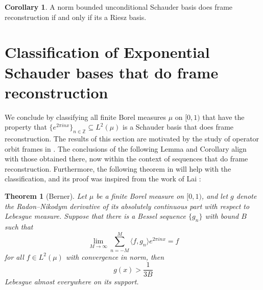 \documentclass[11pt]{amsart}
\newtheorem*{thm*}{Theorem}
\theoremstyle{definition}
\newtheorem{cor}{Corollary}[section]
\numberwithin{equation}{section}
\begin{document}
\begin{cor}
A norm bounded unconditional Schauder basis does frame reconstruction if and only if its a Riesz basis.
\end{cor}


\section{Classification of Exponential Schauder bases that do frame reconstruction}\label{s8}
We conclude by classifying all finite Borel measures $\mu$ on $[0,1)$ that have the property that $\{ e^{2 \pi i n x} \}_{n \in \mathbb{Z}} \subseteq L^2(\mu)$ is a Schauder basis that does frame reconstruction. The results of this section are motivated by the study of operator orbit frames in \cite{Berner2024Operator}. The conclusions of the following Lemma and Corollary align with those obtained there, now within the context of sequences that do frame reconstruction. Furthermore, the following theorem in \cite{Berner2024Frame-like} will help with the classification, and its proof was inspired from the work of Lai \cite{Lai2011Fourier}:
\begin{thm*}[Berner]
Let $\mu$ be a finite Borel measure on $[0,1)$, and let $g$ denote the Radon–Nikodym derivative of its absolutely continuous part with respect to Lebesgue measure. Suppose that there is a Bessel sequence $\{g_{n}\}$ with bound $B$ such that
$$\lim_{M\to \infty}\sum_{n=-M}^{M}\langle f, g_{n}\rangle e^{2\pi i nx}=f$$
for all $f\in L^{2}(\mu)$ with convergence in norm, then $$g(x)>\frac{1}{3B}$$ Lebesgue almost everywhere on its support.
\end{thm*}
\end{document}
